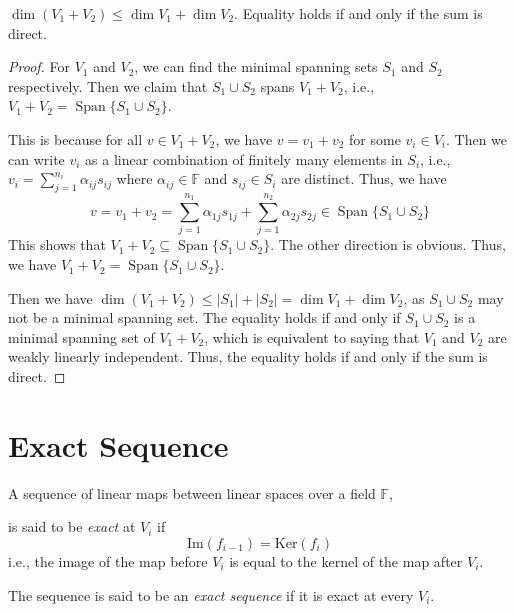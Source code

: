 \documentclass[
	11pt, %
	fleqn, %
	a4paper, %
]{LegrandOrangeBook}
\renewcommand{\ker}[1]{\text{Ker}(#1)} %
\renewcommand{\Im}[1]{\text{Im}(#1)} %
\newcommand{\F}{\mathbb{F}} %
\DeclareMathOperator{\Span}{Span}
\begin{document}
\begin{proposition} \label{prop:dimension_of_sum_of_subspaces}
    $\dim{(V_1 + V_2)} \leq \dim{V_1} + \dim{V_2}$. Equality holds if and only if the sum is direct.
\end{proposition}

\begin{proof}
    For $V_1$ and $V_2$, we can find the minimal spanning sets $S_1$ and $S_2$ respectively. Then we claim that $S_1 \cup S_2$ spans $V_1 + V_2$, i.e., $V_1 + V_2 = \Span\{S_1 \cup S_2\}$. 
    
    This is because for all $v \in V_1 + V_2$, we have $v = v_1 + v_2$ for some $v_i \in V_i$. Then we can write $v_i$ as a linear combination of finitely many elements in $S_i$, i.e., $v_i = \sum_{j=1}^{n_i} \alpha_{ij} s_{ij}$ where $\alpha_{ij} \in \F$ and $s_{ij} \in S_i$ are distinct. Thus, we have 
    \[
        v = v_1 + v_2 = \sum_{j=1}^{n_1} \alpha_{1j} s_{1j} + \sum_{j=1}^{n_2} \alpha_{2j} s_{2j} \in \Span\{S_1 \cup S_2\}
    \]
    This shows that $V_1 + V_2 \subseteq \Span\{S_1 \cup S_2\}$. The other direction is obvious. Thus, we have $V_1 + V_2 = \Span\{S_1 \cup S_2\}$.

    Then we have $\dim{(V_1 + V_2)} \leq |S_1| + |S_2| = \dim{V_1} + \dim{V_2}$, as $S_1 \cup S_2$ may not be a minimal spanning set. The equality holds if and only if $S_1 \cup S_2$ is a minimal spanning set of $V_1 + V_2$, which is equivalent to saying that $V_1$ and $V_2$ are weakly linearly independent. Thus, the equality holds if and only if the sum is direct.
\end{proof}

\newpage

\section{Exact Sequence}

\begin{definition}
    A sequence of linear maps between linear spaces over a field $\F$,
    \begin{center}
    \end{center}
    is said to be \emph{exact} at $V_i$ if 
    \[ \Im{f_{i-1}} = \ker{f_i} \]
    i.e., the image of the map before $V_i$ is equal to the kernel of the map after $V_i$.

    The sequence is said to be an \emph{exact sequence} if it is exact at every $V_i$.
\end{definition}
\end{document}

